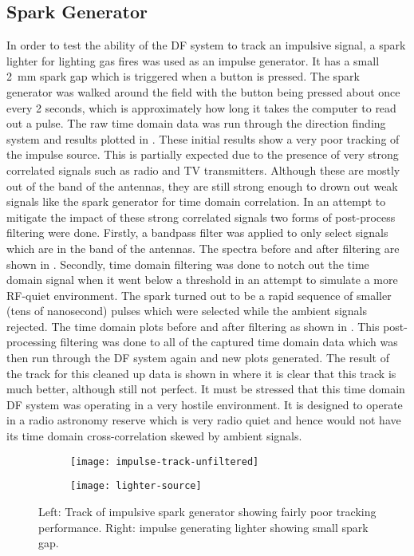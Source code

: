 \subsection{Spark Generator}
In order to test the ability of the DF system to track an impulsive signal, a spark lighter for lighting gas fires was used as an impulse generator. It has a small \SI{2}{\milli\meter} spark gap which is triggered when a button is pressed. The spark generator was walked around the field with the button being pressed about once every 2 seconds, which is approximately how long it takes the computer to read out a pulse. The raw time domain data was run through the direction finding system and results plotted in . These initial results show a very poor tracking of the impulse source. This is partially expected due to the presence of very strong correlated signals such as radio and TV transmitters. Although these are mostly out of the band of the antennas, they are still strong enough to drown out weak signals like the spark generator for time domain correlation. In an attempt to mitigate the impact of these strong correlated signals two forms of post-process filtering were done. Firstly, a bandpass filter was applied to only select signals which are in the band of the antennas. The spectra before and after filtering are shown in . Secondly, time domain filtering was done to notch out the time domain signal when it went below a threshold in an attempt to simulate a more RF-quiet environment. The spark turned out to be a rapid sequence of smaller (tens of nanosecond) pulses which were selected while the ambient signals rejected. The time domain plots before and after filtering as shown in . This post-processing filtering was done to all of the captured time domain data which was then run through the DF system again and new plots generated. The result of the track for this cleaned up data is shown in  where it is clear that this track is much better, although still not perfect. It must be stressed that this time domain DF system was operating in a very hostile environment. It is designed to operate in a radio astronomy reserve which is very radio quiet and hence would not have its time domain cross-correlation skewed by ambient signals.

\begin{figure}
  \centering
  \begin{subfigure}[b]{0.82\textwidth}
    \centering
    \texttt{[image: impulse-track-unfiltered]}
  \end{subfigure}
  \begin{subfigure}[b]{0.17\textwidth}
    \centering
    \texttt{[image: lighter-source]}
  \end{subfigure}
  \caption{Left: Track of impulsive spark generator showing fairly poor tracking performance. Right: impulse generating lighter showing small spark gap.}
  \label{fig:field-trials:impulse-source}
\end{figure}

